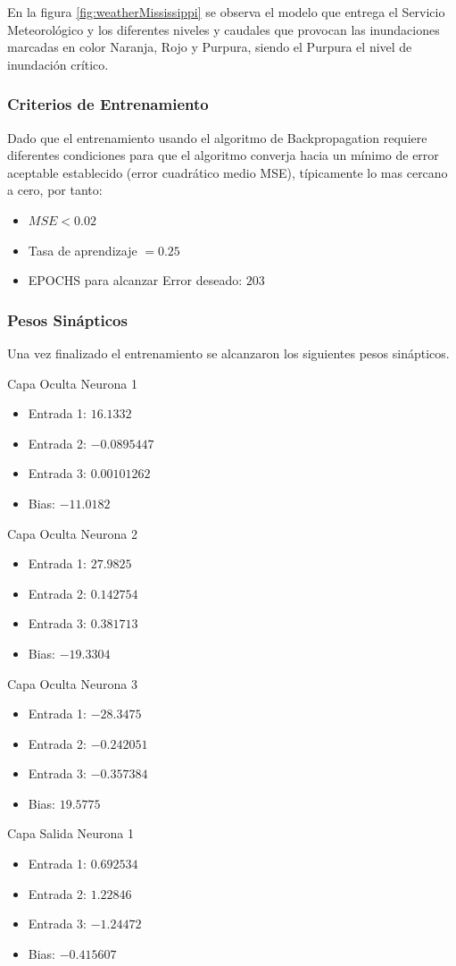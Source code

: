 En la figura \ref{fig:weatherMississippi} se observa el modelo que entrega el Servicio Meteorológico y los diferentes niveles y caudales que provocan las inundaciones marcadas en color Naranja, Rojo y Purpura, siendo el Purpura el nivel de inundación crítico.

\subsubsection{Criterios de Entrenamiento}
Dado que el entrenamiento usando el algoritmo de Backpropagation requiere diferentes condiciones para que el algoritmo converja hacia un mínimo de error aceptable establecido (error cuadrático medio MSE), típicamente lo mas cercano a cero, por tanto:
\begin{itemize}
    \item $MSE < 0.02$
    \item Tasa de aprendizaje $= 0.25$
    \item EPOCHS para alcanzar Error deseado: $203$
\end{itemize}

\subsubsection{Pesos Sinápticos}
Una vez finalizado el entrenamiento se alcanzaron los siguientes pesos sinápticos.

Capa Oculta Neurona 1
\begin{itemize}
    \item Entrada 1: $16.1332$
    \item Entrada 2: $-0.0895447$
    \item Entrada 3: $0.00101262$
    \item Bias: $-11.0182$
\end{itemize}
Capa Oculta Neurona 2
\begin{itemize}
    \item Entrada 1: $27.9825$
    \item Entrada 2: $0.142754$
    \item Entrada 3: $0.381713$
    \item Bias: $-19.3304$
\end{itemize}
Capa Oculta Neurona 3
\begin{itemize}
    \item Entrada 1: $-28.3475$
    \item Entrada 2: $-0.242051$
    \item Entrada 3: $-0.357384$
    \item Bias: $19.5775$
\end{itemize}
Capa Salida Neurona 1
\begin{itemize}
    \item Entrada 1: $0.692534$
    \item Entrada 2: $1.22846$
    \item Entrada 3: $-1.24472$
    \item Bias: $-0.415607$
\end{itemize}

